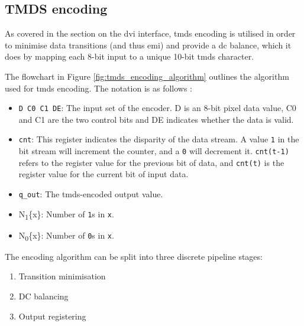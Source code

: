 \subsection{TMDS encoding}
As covered in the section on the \gls{dvi} interface, \gls{tmds} encoding is utilised in order to minimise data transitions (and thus \gls{emi}) and provide a \gls{dc} balance, which it does by mapping each 8-bit input to a unique 10-bit \gls{tmds} character.

The flowchart in Figure \ref{fig:tmds_encoding_algorithm} outlines the algorithm used for \gls{tmds} encoding. The notation is as follows \cite{dvi_spec}:
\begin{itemize}
    \item \texttt{D C0 C1 DE}: The input set of the encoder. D is an 8-bit pixel data value, C0 and C1 are the two control bits and DE indicates whether the data is valid.
    \item \texttt{cnt}: This register indicates the disparity of the data stream. A value \texttt{1} in the bit stream will increment the counter, and a \texttt{0} will decrement it. \texttt{cnt(t-1)} refers to the register value for the previous bit of data, and \texttt{cnt(t)} is the register value for the current bit of input data.
    \item \texttt{q\_out}: The \gls{tmds}-encoded output value.
    \item N\textsubscript{1}\{x\}: Number of \texttt{1}s in \texttt{x}.
    \item N\textsubscript{0}\{x\}: Number of \texttt{0}s in \texttt{x}.
\end{itemize}

The encoding algorithm can be split into three discrete pipeline stages:
\begin{enumerate}
    \item Transition minimisation
    \item DC balancing
    \item Output registering
\end{enumerate}

